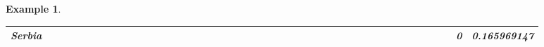 \documentclass[a4paper,11pt]{report}
\newtheorem{example}[theorem]{Example}
\begin{document}
\begin{example}
\begin{appendices}
\begin{landscape}
\begin{longtable}{r|r|r|r|r|r|r|r|r|r|r|r|r|r|r|r|r|r|r|r|r|r|r|r|r|r|r|r|r|r|r|r|r|r|r|r|r|r|r|r|r|r|r|r|}
\multicolumn{1}{|r|}{\textbf{Serbia}}          &                                       &                                       &                                       &                                          &                                       &                                       &                                        &                                       &                                      &                                       &                                       &                                                &                                       &                                      &                                       &                                       &                                      &                                       &                                       &                                       &                                      &                                     &                                      &                                         &                                     &                                       &                                          &                                      &                                       &                                      &                                          &                                      &                                        &                                     &                                      &                                           &                                               &                                       &                                              &                                      &                                     & 0                                             & 0.165969147                             \\ \hline

\end{longtable}
\end{landscape}
\end{appendices}
\end{example}
\end{document}
